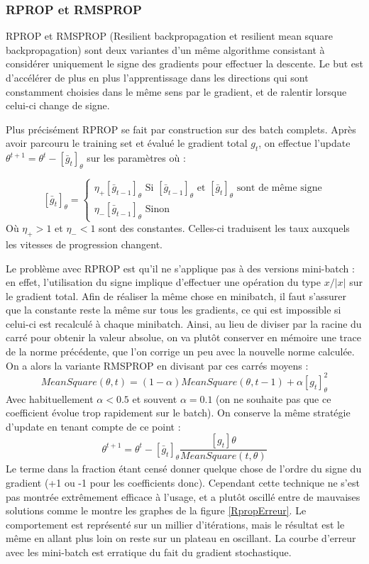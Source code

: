 \documentclass[conference]{IEEEtran}
\begin{document}
\subsubsection{RPROP et RMSPROP}
RPROP et RMSPROP (Resilient backpropagation et resilient mean square backpropagation) sont deux variantes d'un même algorithme consistant à considérer uniquement le signe des gradients pour effectuer la descente. Le but est d'accélérer de plus en plus l'apprentissage dans les directions qui sont constamment choisies dans le même sens par le gradient, et de ralentir lorsque celui-ci change de signe. 

Plus précisément RPROP se fait par construction sur des batch complets. Après avoir parcouru le training set et évalué le gradient total $g_t$, on effectue l'update $\theta^{t+1}=\theta^t-[\bar{g}_t]_\theta$ sur les paramètres où :

$$
[\bar{g}_t]_\theta=\left\{
\begin{array}{l}
\eta_+[\bar{g}_{t-1}]_\theta \mbox{ Si $[\bar{g}_{t-1}]_\theta$ et $[\bar{g}_{t}]_\theta$ sont de même signe} \\
\eta_-[\bar{g}_{t-1}]_\theta \mbox{ Sinon} 
\end{array}
\right.
$$
Où $\eta_+>1$ et $\eta_-<1$ sont des constantes. Celles-ci traduisent les taux auxquels les vitesses de progression changent.

Le problème avec RPROP est qu'il ne s'applique pas à des versions mini-batch : en effet, l'utilisation du signe implique d'effectuer une opération du type $x/|x|$ sur le gradient total. Afin de réaliser la même chose en minibatch, il faut s'assurer que la constante reste la même sur tous les gradients, ce qui est impossible si celui-ci est recalculé à chaque minibatch. Ainsi, au lieu de diviser par la racine du carré pour obtenir la valeur absolue, on va plutôt conserver en mémoire une trace de la norme précédente, que l'on corrige un peu avec la nouvelle norme calculée. On a alors la variante RMSPROP en divisant par ces carrés moyens :
$$MeanSquare(\theta,t)=(1-\alpha)MeanSquare(\theta,t-1)+\alpha [g_t]_\theta^2$$
Avec habituellement $\alpha<0.5$ et souvent $\alpha=0.1$ (on ne souhaite pas que ce coefficient évolue trop rapidement sur le batch). On conserve la même stratégie d'update en tenant compte de ce point :
$$\theta^{t+1}=\theta^t-[\bar{g}_t]_\theta\frac{[g_t]\theta}{MeanSquare(t,\theta)}$$
Le terme dans la fraction étant censé donner quelque chose de l'ordre du signe du gradient (+1 ou -1 pour les coefficients donc).
Cependant cette technique ne s'est pas montrée extrêmement efficace à l'usage, et a plutôt oscillé entre de mauvaises solutions comme le montre les graphes de la figure \ref{RpropErreur}. Le comportement est représenté sur un millier d'itérations, mais le résultat est le même en allant plus loin on reste sur un plateau en oscillant. La courbe d'erreur avec les mini-batch est erratique du fait du gradient stochastique.
\end{document}
